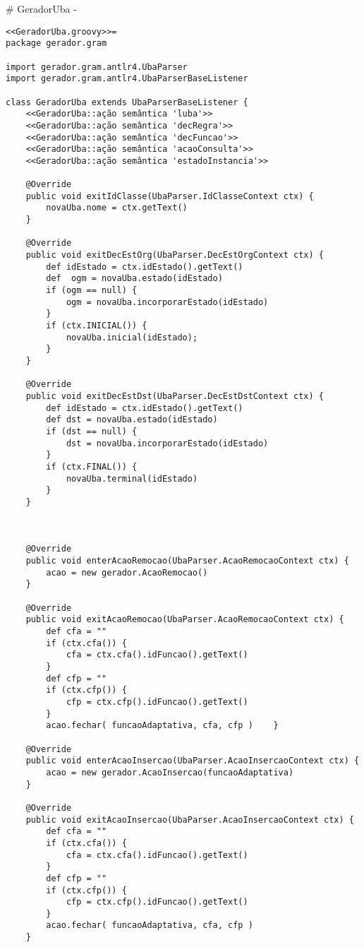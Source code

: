 # GeradorUba {-}

\begin{lstlisting}[style=java]
<<GeradorUba.groovy>>=
package gerador.gram

import gerador.gram.antlr4.UbaParser
import gerador.gram.antlr4.UbaParserBaseListener

class GeradorUba extends UbaParserBaseListener {
    <<GeradorUba::ação semântica 'luba'>>
    <<GeradorUba::ação semântica 'decRegra'>>
    <<GeradorUba::ação semântica 'decFuncao'>>
    <<GeradorUba::ação semântica 'acaoConsulta'>>
    <<GeradorUba::ação semântica 'estadoInstancia'>>

    @Override
    public void exitIdClasse(UbaParser.IdClasseContext ctx) {
        novaUba.nome = ctx.getText()
    }

    @Override
    public void exitDecEstOrg(UbaParser.DecEstOrgContext ctx) {
        def idEstado = ctx.idEstado().getText()
        def  ogm = novaUba.estado(idEstado)
        if (ogm == null) {
            ogm = novaUba.incorporarEstado(idEstado)
        }
        if (ctx.INICIAL()) {
            novaUba.inicial(idEstado);
        }
    }

    @Override
    public void exitDecEstDst(UbaParser.DecEstDstContext ctx) {
        def idEstado = ctx.idEstado().getText()
        def dst = novaUba.estado(idEstado)
        if (dst == null) {
            dst = novaUba.incorporarEstado(idEstado)
        }
        if (ctx.FINAL()) {
            novaUba.terminal(idEstado)
        }
    }



    @Override
    public void enterAcaoRemocao(UbaParser.AcaoRemocaoContext ctx) {
        acao = new gerador.AcaoRemocao()
    }

    @Override
    public void exitAcaoRemocao(UbaParser.AcaoRemocaoContext ctx) {
        def cfa = ""
        if (ctx.cfa()) {
            cfa = ctx.cfa().idFuncao().getText()
        }
        def cfp = ""
        if (ctx.cfp()) {
            cfp = ctx.cfp().idFuncao().getText()
        }
        acao.fechar( funcaoAdaptativa, cfa, cfp )    }

    @Override
    public void enterAcaoInsercao(UbaParser.AcaoInsercaoContext ctx) {
        acao = new gerador.AcaoInsercao(funcaoAdaptativa)
    }

    @Override
    public void exitAcaoInsercao(UbaParser.AcaoInsercaoContext ctx) {
        def cfa = ""
        if (ctx.cfa()) {
            cfa = ctx.cfa().idFuncao().getText()
        }
        def cfp = ""
        if (ctx.cfp()) {
            cfp = ctx.cfp().idFuncao().getText()
        }
        acao.fechar( funcaoAdaptativa, cfa, cfp )
    }


\end{lstlisting}
